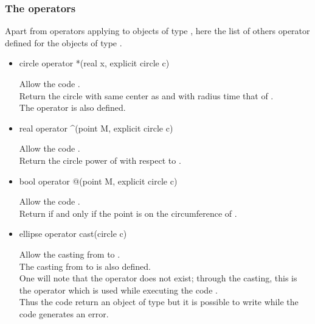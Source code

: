 \documentclass[pdftex]{article}
\newcommand{\ssi}{if and only if\xspace}
\begin{document}
\subsubsection{The operators}
Apart from operators applying to objects of type , here
the list of others operator defined for the objects of type .
\begin{itemize}
\item {}%
  \begin{Vcolor}
    circle operator *(real x, explicit circle c)
  \end{Vcolor}
  Allow the code .\\
  Return the circle with same center as  and with radius 
  time that of .\\
  The operator  is
  also defined.
\item {}%
  \begin{Vcolor}
    real operator ^(point M, explicit circle c)
  \end{Vcolor}
  Allow the code .\\
  Return the circle power of  with respect to .
\item {}%
  \begin{Vcolor}
    bool operator @(point M, explicit circle c)
  \end{Vcolor}
  Allow the code .\\
  Return  \ssi the point  is on the circumference of .
\item {}%
  \begin{Vcolor}
    ellipse operator cast(circle c)
  \end{Vcolor}
  Allow the casting from  to .\\
  The casting from  to  is also defined.\\
  One will note that the operator  does
  not exist; through the casting, this is the operator  which is used while executing
  the code .\\
  Thus the code  return an object of type
   but it is possible to write
   while the code
   generates an error.
\end{itemize}
\end{document}
